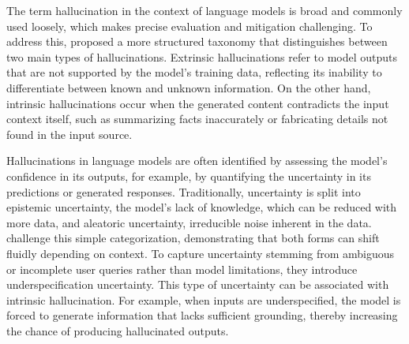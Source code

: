 \documentclass[letterpaper]{article} %
\begin{document}
The term hallucination in the context of language models is broad and commonly used loosely, which makes precise evaluation and mitigation challenging. To address this, \citet{Ji_2023} proposed a more structured taxonomy that distinguishes between two main types of hallucinations. Extrinsic hallucinations refer to model outputs that are not supported by the model’s training data, reflecting its inability to differentiate between known and unknown information. On the other hand, intrinsic hallucinations occur when the generated content contradicts the input context itself, such as summarizing facts inaccurately or fabricating details not found in the input source.





Hallucinations in language models are often identified by assessing the model's confidence in its outputs, for example, by quantifying the uncertainty in its predictions or generated responses.
Traditionally, uncertainty is split into epistemic uncertainty, the model’s lack of knowledge, which can be reduced with more data, and aleatoric uncertainty, irreducible noise inherent in the data. \citet{kirchhof2025positionuncertaintyquantificationneeds} challenge this simple categorization, demonstrating that both forms can shift fluidly depending on context.
To capture uncertainty stemming from ambiguous or incomplete user queries rather than model limitations, they introduce underspecification uncertainty. This type of uncertainty can be associated with intrinsic hallucination. For example, when inputs are underspecified, the model is forced to generate information that lacks sufficient grounding, thereby increasing the chance of producing hallucinated outputs.
\end{document}
